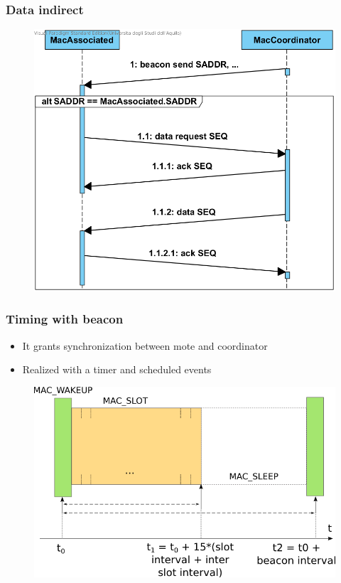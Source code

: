\begin{frame}[fragile]
  \frametitle{Data indirect}
  \vspace{-2.7em}
  \begin{figure}
    \centering
    \includegraphics[width=.7\textwidth]{img/DataRequest.png}
  \end{figure}
\end{frame}

\begin{frame}[fragile]
  \frametitle{Timing with beacon}
  \begin{itemize}
    \item It grants synchronization between mote and coordinator
    \item Realized with a timer and scheduled events
  \end{itemize}
  \begin{figure}
    \centering
    \includegraphics[width=.7\textwidth]{img/MAC_STATES.png}
  \end{figure}
\end{frame}

